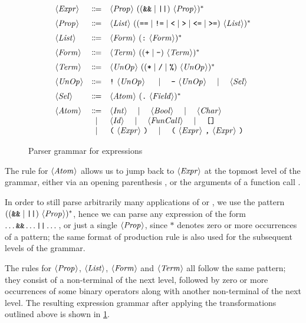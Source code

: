 \begin{figure}[th]
  \[
  \begin{array}{lcl}
		\NT{Expr} & \Coloneqq & \NT{Prop}\ ((\code{\&\&} \mid \code{||})\ \NT{Prop})^* \br
		\NT{Prop} & \Coloneqq & \NT{List}\ ((\code{==} \mid \code{!=} \mid \code{<} \mid \code{>} \mid \code{<=} \mid \code{>=})\ \NT{List})^* \br
		\NT{List} & \Coloneqq & \NT{Form}\ (\code{:}\ \NT{Form})^* \br
		\NT{Form} & \Coloneqq & \NT{Term}\ (( \code{+} \mid \code{-} )\ \NT{Term})^* \br
		\NT{Term} & \Coloneqq & \NT{UnOp}\ (( \code{*} \mid \code{/} \mid \code{\%} )\ \NT{UnOp} )^* \br
    \NT{UnOp} & \Coloneqq & \code{!}\ \NT{UnOp}\ \ruleSep \code{-}\ \NT{UnOp} \ruleSep \NT{Sel} \br
    \NT{Sel} & \Coloneqq & \NT{Atom}\ (\code{.}\ \NT{Field})^* \br
    \NT{Atom} & \Coloneqq & \NT{Int} \ruleSep \NT{Bool} \ruleSep \NT{Char} \\
    & \mid & \NT{Id} \ruleSep \NT{FunCall} \ruleSep \code{[]} \\
    & \mid & \code{(}\ \NT{Expr}\ \code{)} \ruleSep
        \code{(}\ \NT{Expr}\ \code{,}\ \NT{Expr}\ \code{)} \\
  \end{array}
  \]
  \caption{Parser grammar for expressions}
  \label{fig:new-expr-grammar}
\end{figure}
%

The rule for $\langle \textit{Atom}\kern.7pt \rangle$ allows us to jump back to $\langle \textit{Expr}\kern.7pt \rangle$ at the topmost
level of the grammar, either via an opening parenthesis \spl{(}, or the
arguments of a function call .

In order to still parse arbitrarily many applications of \code{\&\&} or
\code{||}, we use the pattern $((\texttt{\&\&} \mid \texttt{||})\ \langle \textit{Prop}\kern.7pt \rangle)^*$,
hence we can parse any expression of the form $\dots \texttt{\&\&} \dots \texttt{||} \dots$,
or just a single $\langle \textit{Prop}\kern.7pt \rangle$, since $*$ denotes zero or more occurrences of
a pattern; the same format of production rule is also used for the subsequent
levels of the grammar.

The rules for $\langle \textit{Prop}\kern.7pt \rangle$, $\langle \textit{List}\kern.7pt \rangle$, $\langle \textit{Form}\kern.7pt \rangle$ and $\langle \textit{Term}\kern.7pt \rangle$ all follow
the same pattern; they consist of a non-terminal of the next level,
followed by zero or more occurrences of some binary operators along with another
non-terminal of the next level. The resulting expression grammar after applying
the transformations outlined above is shown in \cref{fig:new-expr-grammar}.


